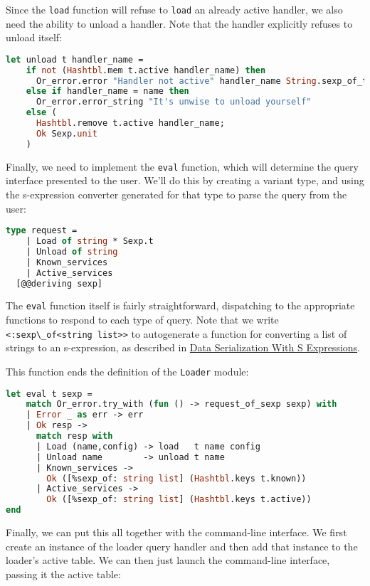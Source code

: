 Since the \passthrough{\lstinline!load!} function will refuse to
\passthrough{\lstinline!load!} an already active handler, we also need
the ability to unload a handler. Note that the handler explicitly
refuses to unload itself:

\begin{lstlisting}[language=Caml]
let unload t handler_name =
    if not (Hashtbl.mem t.active handler_name) then
      Or_error.error "Handler not active" handler_name String.sexp_of_t
    else if handler_name = name then
      Or_error.error_string "It's unwise to unload yourself"
    else (
      Hashtbl.remove t.active handler_name;
      Ok Sexp.unit
    )
\end{lstlisting}

Finally, we need to implement the \passthrough{\lstinline!eval!}
function, which will determine the query {interface} presented to the
user. We'll do this by creating a variant type, and using the
s-expression converter generated for that type to parse the query from
the user:

\begin{lstlisting}[language=Caml]
type request =
    | Load of string * Sexp.t
    | Unload of string
    | Known_services
    | Active_services
  [@@deriving sexp]
\end{lstlisting}

The \passthrough{\lstinline!eval!} function itself is fairly
straightforward, dispatching to the appropriate functions to respond to
each type of query. Note that we write
\passthrough{\lstinline!<:sexp\_of<string list>>!} to autogenerate a
function for converting a list of strings to an s-expression, as
described in
\href{data-serialization.html\#data-serialization-with-s-expressions}{Data
Serialization With S Expressions}.

This function ends the definition of the
\passthrough{\lstinline!Loader!} module:

\begin{lstlisting}[language=Caml]
let eval t sexp =
    match Or_error.try_with (fun () -> request_of_sexp sexp) with
    | Error _ as err -> err
    | Ok resp ->
      match resp with
      | Load (name,config) -> load   t name config
      | Unload name        -> unload t name
      | Known_services ->
        Ok ([%sexp_of: string list] (Hashtbl.keys t.known))
      | Active_services ->
        Ok ([%sexp_of: string list] (Hashtbl.keys t.active))
end
\end{lstlisting}

Finally, we can put this all together with the command-line interface.
We first create an instance of the loader query handler and then add
that instance to the loader's active table. We can then just launch the
command-line interface, passing it the active table:

